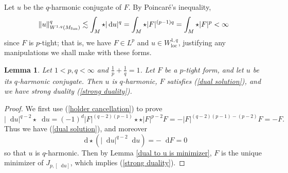 \documentclass[reqno,11pt]{amsart}
\newcommand{\RR}{\mathbf{R}}
\newcommand*\dif{\mathop{}\!\mathrm{d}}
\newcommand{\loc}{\mathrm{loc}}
\newtheorem{lemma}[theorem]{Lemma}
\newtheorem{corollary}[theorem]{Corollary}
\theoremstyle{definition}
\numberwithin{equation}{section}
\newcommand\todo[1]{\textcolor{red}{TODO: #1}}
\begin{document}
Let $u$ be the $q$-harmonic conjugate of $F$.
By Poincar\'e's inequality,
$$\|u\|_{W^{1, q}(M_{\rm fun})}^q \lesssim \int_M \star |\dif u|^q = \int_M \star |F|^{(p - 1)q} = \int_M \star |F|^p < \infty$$
since $F$ is $p$-tight; that is, we have $F \in L^p$ and $u \in W^{1, q}_\loc$, justifying any manipulations we shall make with these forms.

\begin{lemma}
Let $1 < p, q < \infty$ and $\frac{1}{p} + \frac{1}{q} = 1$.
Let $F$ be a $p$-tight form, and let $u$ be its $q$-harmonic conjugate.
Then $u$ is $q$-harmonic, $F$ satisfies (\ref{dual solution}), and we have strong duality (\ref{strong duality}).
\end{lemma}
\begin{proof}
We first use (\ref{holder cancellation}) to prove
$$|\dif u|^{q - 2} \star \dif u = (-1)^d |F|^{(q - 2)(p - 1)} \star \star |F|^{p - 2} F = - |F|^{(q - 2)(p - 1) - (p - 2)} F = - F.$$
Thus we have (\ref{dual solution}), and moreover
$$\dif \star (|\dif u|^{q - 2} \dif u) = - \dif F = 0$$
so that $u$ is $q$-harmonic.
Then by Lemma \ref{dual to u is minimizer}, $F$ is the unique minimizer of $J_{p, [\dif u]}$, which implies (\ref{strong duality}).
\end{proof}



\end{document}
